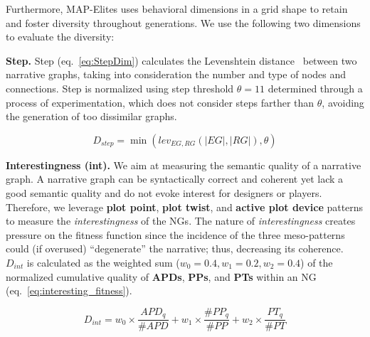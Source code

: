 Furthermore, MAP-Elites uses behavioral dimensions in a grid shape to retain and foster diversity throughout generations. We use the following two dimensions to evaluate the diversity: 

\textbf{Step.} Step (eq.~\ref{eq:StepDim}) calculates the Levenshtein distance~\cite{p12Levenshtein96-editDistance} between two narrative graphs, taking into consideration the number and type of nodes and connections. Step is normalized using step threshold $\theta = 11$ determined through a process of experimentation, which does not consider steps farther than $\theta$, avoiding the generation of too dissimilar graphs.

\begin{equation}
\label{eq:StepDim}
D_{step} =  \min (lev_{EG,RG} (|EG|, |RG|), \theta)
\end{equation}

\textbf{Interestingness (int).} We aim at measuring the semantic quality of a narrative graph. A narrative graph can be syntactically correct and coherent yet lack a good semantic quality and do not evoke interest for designers or players. Therefore, we leverage \textbf{plot point}, \textbf{plot twist}, and \textbf{active plot device} patterns to measure the \emph{interestingness} of the NGs. The nature of \emph{interestingness} creates pressure on the fitness function since the incidence of the three meso-patterns could (if overused) ``degenerate'' the narrative; thus, decreasing its coherence. $D_{int}$ is calculated as the weighted sum ($w_{0}=0.4, w_{1}=0.2, w_{2}=0.4$) of the normalized cumulative quality of \textbf{APDs}, \textbf{PPs}, and \textbf{PTs} within an NG (eq.~\ref{eq:interesting_fitness}).

\begin{equation}
\label{eq:interesting_fitness}
D_{int} = w_{0} \times \frac{APD_{q}}{\#APD} + w_{1} \times \frac{\#PP_{q}}{\#PP} +  w_{2} \times \frac{PT_{q}}{\#PT}
\end{equation}







